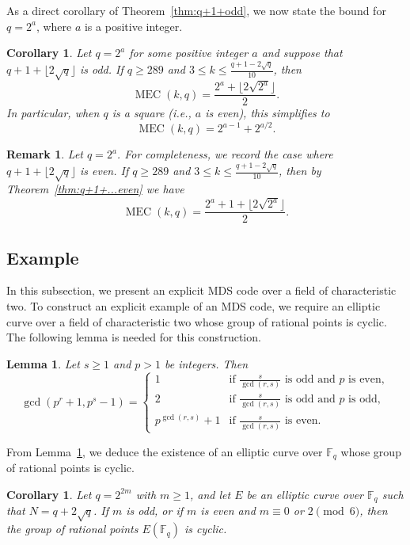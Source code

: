 \documentclass[journal,12pt,onecolumn]{IEEEtran}
\newtheorem{lemma}[theorem]{Lemma}
\newtheorem{corollary}[theorem]{Corollary}
\newtheorem{remark}[theorem]{Remark}
\begin{document}
As a direct corollary of Theorem~\ref{thm:q+1+odd}, we now state the bound for $q = 2^a$, where $a$ is a positive integer.

\begin{corollary}\label{cor:boundforcharq=2}
Let $q = 2^a$ for some positive integer $a$ and suppose that $q+1+\lfloor 2\sqrt{q}\rfloor$ is odd. If $q \ge 289$ and $3 \le k \le \frac{q+1-2\sqrt{q}}{10}$, then
\[
\operatorname{MEC}(k, q) = \frac{2^a + \lfloor 2\sqrt{2^a} \rfloor}{2}.
\]
In particular, when $q$ is a square (i.e., $a$ is even), this simplifies to
\[
\operatorname{MEC}(k, q) = 2^{a-1} + 2^{a/2}.
\]
\end{corollary}

\begin{remark}\label{remark:2boundforcharq=2}
Let $q = 2^a$. For completeness, we record the case where $q+1+\lfloor 2\sqrt{q}\rfloor$ is even. If $q \ge 289$ and $3 \le k \le \frac{q+1-2\sqrt{q}}{10}$, then by Theorem~\ref{thm:q+1+...even} we have
\[
\operatorname{MEC}(k, q) = \frac{2^a + 1 + \lfloor 2\sqrt{2^a} \rfloor}{2}.
\]
\end{remark}

\subsection{Example}
In this subsection, we present an explicit MDS code over a field of characteristic two. 
To construct an explicit example of an MDS code, we require an elliptic curve over a field of characteristic two whose group of rational points is cyclic. 
The following lemma is needed for this construction.
\begin{lemma}\label{lem:GCD}
\cite[Lemma 2]{MR4568185} Let $s \ge 1$ and $p > 1$ be integers. Then
\[
\gcd\left(p^{r}+1, p^{s}-1\right)
= \begin{cases}
1 & \text{if } \frac{s}{\gcd(r, s)} \text{ is odd and } p \text{ is even}, \\[4pt]
2 & \text{if } \frac{s}{\gcd(r, s)} \text{ is odd and } p \text{ is odd}, \\[4pt]
p^{\gcd(r, s)}+1 & \text{if } \frac{s}{\gcd(r, s)} \text{ is even}.
\end{cases}
\]
\end{lemma}



 From Lemma~\ref{lem:GCD}, we deduce the existence of an elliptic curve over $\mathbb{F}_q$ whose group of rational points is cyclic.

\begin{corollary}\label{cor:point:cyclic group}
Let $q = 2^{2m}$ with $m \ge 1$, and let $E$ be an elliptic curve over $\mathbb{F}_q$ such that $N = q + 2\sqrt{q}$. If $m$ is odd, or if $m$ is even and $m \equiv 0$ or $2 \pmod{6}$, then the group of rational points $E(\mathbb{F}_q)$ is cyclic.
\end{corollary}
\end{document}
